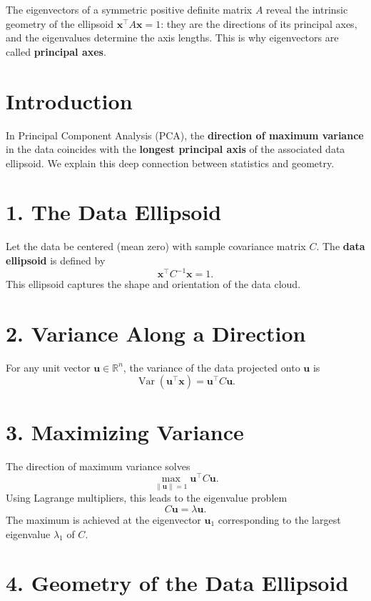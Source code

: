 \documentclass{article}
\begin{document}
The eigenvectors of a symmetric positive definite matrix $ A $ reveal the intrinsic geometry of the ellipsoid $ \mathbf{x}^\top A \mathbf{x} = 1 $: they are the directions of its principal axes, and the eigenvalues determine the axis lengths. This is why eigenvectors are called \textbf{principal axes}.





\section*{Introduction}

In Principal Component Analysis (PCA), the \textbf{direction of maximum variance} in the data coincides with the \textbf{longest principal axis} of the associated data ellipsoid. We explain this deep connection between statistics and geometry.

\section*{1. The Data Ellipsoid}

Let the data be centered (mean zero) with sample covariance matrix $ C $.  
The \textbf{data ellipsoid} is defined by
\[
\mathbf{x}^\top C^{-1} \mathbf{x} = 1.
\]
This ellipsoid captures the shape and orientation of the data cloud.

\section*{2. Variance Along a Direction}

For any unit vector $ \mathbf{u} \in \mathbb{R}^n $, the variance of the data projected onto $ \mathbf{u} $ is
\[
\operatorname{Var}(\mathbf{u}^\top \mathbf{x}) = \mathbf{u}^\top C \mathbf{u}.
\]

\section*{3. Maximizing Variance}

The direction of maximum variance solves
\[
\max_{\|\mathbf{u}\| = 1} \mathbf{u}^\top C \mathbf{u}.
\]
Using Lagrange multipliers, this leads to the eigenvalue problem
\[
C \mathbf{u} = \lambda \mathbf{u}.
\]
The maximum is achieved at the eigenvector $ \mathbf{u}_1 $ corresponding to the largest eigenvalue $ \lambda_1 $ of $ C $.

\section*{4. Geometry of the Data Ellipsoid}
\end{document}
